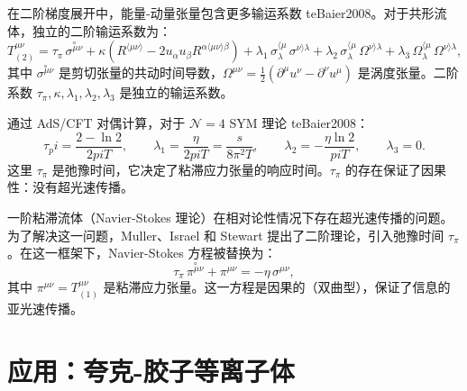 \begin{definition}[二阶输运系数]\label{def:second-order-transport}
在二阶梯度展开中，能量-动量张量包含更多输运系数 	te{Baier2008}。对于共形流体，独立的二阶输运系数为：
\begin{equation}\label{eq:second-order}
    T^{\mu\nu}_{(2)} = \tau_\pi\,\overset{\circ}{\sigma^{\mu\nu}} + \kappa\left(R^{\langle\mu\nu\rangle} - 2u_\alpha u_\beta R^{\alpha\langle\mu\nu\rangle\beta}\right) + \lambda_1\,\sigma^{\langle\mu}_\lambda\,\sigma^{\nu\rangle\lambda} + \lambda_2\,\sigma^{\langle\mu}_\lambda\,\Omega^{\nu\rangle\lambda} + \lambda_3\,\Omega^{\langle\mu}_\lambda\,\Omega^{\nu\rangle\lambda},
\end{equation}
其中 $\overset{\circ}{\sigma^{\mu\nu}}$ 是剪切张量的共动时间导数，$\Omega^{\mu\nu} = \frac{1}{2}(\partial^\mu u^\nu - \partial^\nu u^\mu)$ 是涡度张量。二阶系数 $\tau_\pi, \kappa, \lambda_1, \lambda_2, \lambda_3$ 是独立的输运系数。
\end{definition}

\begin{property}[全息计算的二阶输运系数]\label{prop:second-order-holographic}
通过 AdS/CFT 对偶计算，对于 $\mathcal{N}=4$ SYM 理论 	te{Baier2008}：
\begin{equation}
    \tau_pi = \frac{2-\ln 2}{2pi T}, \qquad \lambda_1 = \frac{\eta}{2pi T} = \frac{s}{8\pi^2 T}, \qquad \lambda_2 = -\frac{\eta\ln 2}{pi T}, \qquad \lambda_3 = 0.
\end{equation}
这里 $\tau_\pi$ 是弛豫时间，它决定了粘滞应力张量的响应时间。$\tau_\pi$ 的存在保证了因果性：没有超光速传播。
\end{property}

\begin{remark}
一阶粘滞流体（Navier-Stokes 理论）在相对论性情况下存在超光速传播的问题。为了解决这一问题，Muller、Israel 和 Stewart 提出了二阶理论，引入弛豫时间 $\tau_\pi$。在这一框架下，Navier-Stokes 方程被替换为：
\begin{equation}\label{eq:MIS}
    \tau_\pi\,\overset{\circ}{\pi^{\mu\nu}} + \pi^{\mu\nu} = -\eta\,\sigma^{\mu\nu},
\end{equation}
其中 $\pi^{\mu\nu} = T^{\mu\nu}_{(1)}$ 是粘滞应力张量。这一方程是因果的（双曲型），保证了信息的亚光速传播。
\end{remark}


\section{应用：夸克-胶子等离子体}

